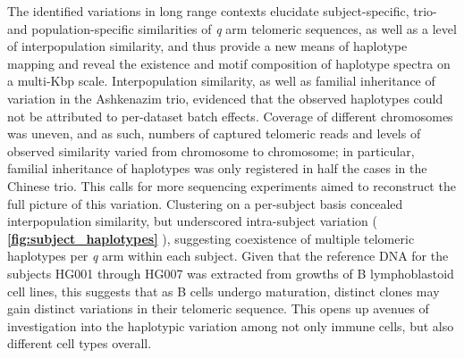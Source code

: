 \documentclass{article}
\begin{document}
    The identified variations in long range contexts elucidate
        subject-specific, trio- and population-specific similarities of \textit{q} arm telomeric sequences,
            as well as a level of interpopulation similarity,
        and thus provide a new means of haplotype mapping and reveal the existence and motif composition of haplotype spectra
            on a multi-Kbp scale.
    Interpopulation similarity, as well as familial inheritance of variation in the Ashkenazim trio,
        evidenced that the observed haplotypes could not be attributed to per-dataset batch effects.
    Coverage of different chromosomes was uneven,
        and as such, numbers of captured telomeric reads and levels of observed similarity varied from chromosome to chromosome;
        in particular, familial inheritance of haplotypes was only registered in half the cases in the Chinese trio.
        This calls for more sequencing experiments aimed to reconstruct the full picture of this variation.
    Clustering on a per-subject basis concealed interpopulation similarity,
        but underscored intra-subject variation (
            \textbf{\autoref{fig:subject_haplotypes}} %
        ),
            suggesting coexistence of multiple telomeric haplotypes per \textit{q} arm within each subject.
        Given that the reference DNA for the subjects HG001 through HG007
            was extracted from growths of B lymphoblastoid cell lines,
            this suggests that as B cells undergo maturation,
                distinct clones may gain distinct variations in their telomeric sequence.
        This opens up avenues of investigation into the haplotypic variation among not only immune cells,
            but also different cell types overall.
\end{document}
